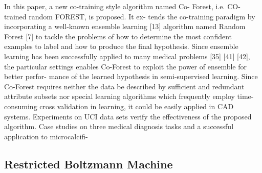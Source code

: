 \documentclass[journal]{IEEEtran}
\begin{document}
In this paper, a new co-training style algorithm named Co- Forest, i.e. CO-trained random FOREST, is proposed. It ex- tends the co-training paradigm by incorporating a well-known ensemble learning [13] algorithm named Random Forest [7] to tackle the problems of how to determine the most confident examples to label and how to produce the final hypothesis. Since ensemble learning has been successfully applied to many medical problems [35] [41] [42], the particular settings enables Co-Forest to exploit the power of ensemble for better perfor- mance of the learned hypothesis in semi-supervised learning. Since Co-Forest requires neither the data be described by sufficient and redundant attribute subsets nor special learning algorithms which frequently employ time-consuming cross validation in learning, it could be easily applied in CAD systems. Experiments on UCI data sets verify the effectiveness of the proposed algorithm. Case studies on three medical diagnosis tasks and a successful application to microcalcifi-
\subsection{Restricted Boltzmann Machine}
\end{document}
